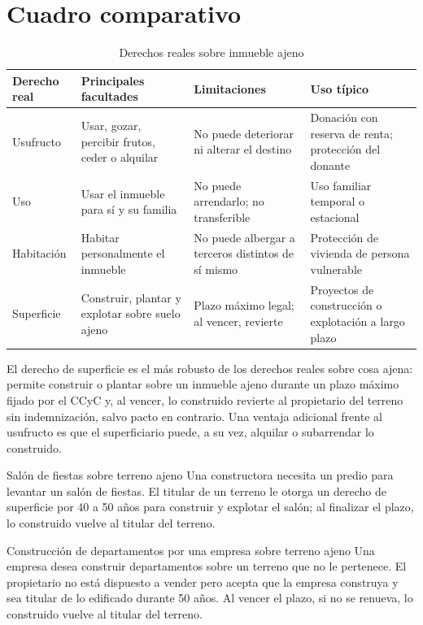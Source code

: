 \documentclass[12pt,oneside]{book}
\begin{document}
\section{Cuadro comparativo}

\begin{table}[H]
\centering
\caption{Derechos reales sobre inmueble ajeno}
\small
\renewcommand{\arraystretch}{1.2}
\begin{tabularx}{\textwidth}{>{\raggedright\arraybackslash}p{}>{\raggedright\arraybackslash}X>{\raggedright\arraybackslash}X>{\raggedright\arraybackslash}X}
\toprule
\textbf{Derecho real} & \textbf{Principales facultades} & \textbf{Limitaciones} & \textbf{Uso típico} \\
\midrule
Usufructo & Usar, gozar, percibir frutos, ceder o alquilar & No puede deteriorar ni alterar el destino & Donación con reserva de renta; protección del donante \\
Uso & Usar el inmueble para sí y su familia & No puede arrendarlo; no transferible & Uso familiar temporal o estacional \\
Habitación & Habitar personalmente el inmueble & No puede albergar a terceros distintos de sí mismo & Protección de vivienda de persona vulnerable \\
Superficie & Construir, plantar y explotar sobre suelo ajeno & Plazo máximo legal; al vencer, revierte & Proyectos de construcción o explotación a largo plazo \\
\bottomrule
\end{tabularx}
\end{table}

El derecho de superficie es el más robusto de los derechos reales sobre cosa ajena: permite construir o plantar sobre un inmueble ajeno durante un plazo máximo fijado por el CCyC y, al vencer, lo construido revierte al propietario del terreno sin indemnización, salvo pacto en contrario. Una ventaja adicional frente al usufructo es que el superficiario puede, a su vez, alquilar o subarrendar lo construido.

\begin{example}{Salón de fiestas sobre terreno ajeno}
Una constructora necesita un predio para levantar un salón de fiestas. El titular de un terreno le otorga un derecho de superficie por 40 a 50 años para construir y explotar el salón; al finalizar el plazo, lo construido vuelve al titular del terreno.
\end{example}

\begin{example}{Construcción de departamentos por una empresa sobre terreno ajeno}
Una empresa desea construir departamentos sobre un terreno que no le pertenece. El propietario no está dispuesto a vender pero acepta que la empresa construya y sea titular de lo edificado durante 50 años. Al vencer el plazo, si no se renueva, lo construido vuelve al titular del terreno.
\end{example}
\end{document}
